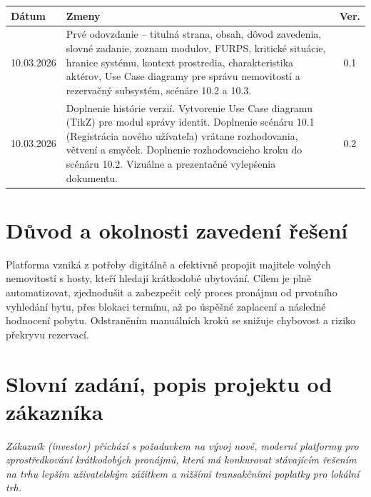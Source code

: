 \documentclass[11pt, a4paper]{article}
\begin{document}
\vspace{0.4cm}
\begin{tabularx}{\textwidth}{|l|X|c|}
  \hline
  \rowcolor{lightblue}
  \textbf{Dátum} & \textbf{Zmeny} & \textbf{Ver.} \\
  \hline
  10.03.2026
    & Prvé odovzdanie -- titulná strana, obsah, dôvod zavedenia, slovné zadanie,
      zoznam modulov, FURPS, kritické situácie, hranice systému, kontext prostredia,
      charakteristika aktérov, Use Case diagramy pre správu nemovitostí
      a rezervačný subsystém, scénáre 10.2 a 10.3.
    & 0.1 \\
  \hline
  \textcolor{newblue}{10.03.2026}
    & \textcolor{newblue}{Doplnenie histórie verzií. Vytvorenie Use Case diagramu
      (TikZ) pre modul správy identit. Doplnenie scénáru 10.1 (Registrácia nového
      užívateľa) vrátane rozhodovania, větvení a smyček. Doplnenie rozhodovacieho
      kroku do scénáru 10.2. Vizuálne a prezentačné vylepšenia dokumentu.}
    & \textcolor{newblue}{0.2} \\
  \hline
\end{tabularx}

\vspace{0.8cm}

\tableofcontents
\newpage

\section{Důvod a okolnosti zavedení řešení}

Platforma vzniká z potřeby digitálně a efektivně propojit majitele volných nemovitostí s hosty, kteří hledají krátkodobé ubytování. Cílem je plně automatizovat, zjednodušit a zabezpečit celý proces pronájmu od prvotního vyhledání bytu, přes blokaci termínu, až po úspěšné zaplacení a následné hodnocení pobytu. Odstraněním manuálních kroků se snižuje chybovost a riziko překryvu rezervací.

\section{Slovní zadání, popis projektu od zákazníka}

\textit{Zákazník (investor) přichází s požadavkem na vývoj nové, moderní platformy pro zprostředkování krátkodobých pronájmů, která má konkurovat stávajícím řešením na trhu lepším uživatelským zážitkem a nižšími transakčními poplatky pro lokální trh.}
\end{document}
